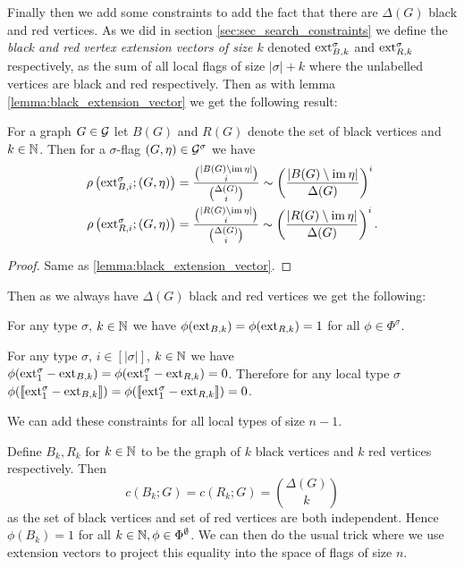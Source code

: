 Finally then we add some constraints to add the fact that there are
$\Delta(G)$ black and red vertices. As we did in section
\ref{sec:sec_search_constraints} we define the
\textit{black and red vertex extension vectors of size $k$} denoted
$\mathrm{ext}_{B,k}^\sigma$ and $\mathrm{ext}_{R,k}^\sigma$ respectively, as the sum of all
local flags of size $|\sigma|+k$ where the unlabelled vertices are black
and red respectively.
Then as with lemma \ref{lemma:black_extension_vector} we get the following result:

\begin{lemma}
    For a graph $G\in\mathcal{G}$ let $B(G)$ and $R(G)$ denote the set of black vertices and
    $k\in \mathbb{N}$. Then for a $\sigma$-flag $(G,\eta) \in \mathcal{G}^\sigma$ we have
    \[
        \begin{split}
            \rho\left(\mathrm{ext}_{B,i}^\sigma; (G,\eta)\right)
            &= \frac{\binom{|B(G) \setminus \operatorname{im}\eta|}{i}}{\binom{\Delta(G)}{i}}
            \sim 
            \left(\frac{|B(G)\setminus\operatorname{im}\eta|}{\Delta(G)}\right)^i\\
            \rho\left(\mathrm{ext}_{R,i}^\sigma; (G,\eta)\right)
            &= \frac{\binom{|R(G) \setminus \operatorname{im}\eta|}{i}}{\binom{\Delta(G)}{i}}
            \sim 
            \left(\frac{|R(G)\setminus\operatorname{im}\eta|}{\Delta(G)}\right)^i.
        \end{split}
    \]
\end{lemma}
\begin{proof}
    Same as \ref{lemma:black_extension_vector}.
\end{proof}
Then as we always have $\Delta(G)$ black and red vertices we get the following:
\begin{corollary}
    For any type $\sigma$, $k\in\mathbb{N}$ we have $\phi(\mathrm{ext}_{B,k})=\phi(\mathrm{ext}_{R,k})=1$
    for all $\phi\in\Phi^\sigma$.
\end{corollary}
\begin{corollary}
    For any type $\sigma$, $i\in[|\sigma|]$, $k\in\mathbb{N}$ we have
    $\phi(\mathrm{ext}_1^\sigma - \mathrm{ext}_{B,k}) = \phi(\mathrm{ext}_1^\sigma - \mathrm{ext}_{R,k}) = 0$.
    Therefore for any local type $\sigma$
    $\phi(\llbracket \mathrm{ext}_1^\sigma - \mathrm{ext}_{B,k}\rrbracket) = \phi(\llbracket \mathrm{ext}_1^\sigma - \mathrm{ext}_{R,k}\rrbracket) = 0$.
\end{corollary}
We can add these constraints for all local types of size $n-1$.

Define $B_k, R_k$ for $k\in\mathbb{N}$ to be the graph of $k$ black vertices and $k$ red vertices
respectively. Then
\[
    c(B_k; G) = c(R_k; G)
    = \binom{\Delta(G)}{k}
\]
as the set of black vertices and set of red vertices are both independent.
Hence $\phi(B_k) = 1$ for all $k\in\mathbb{N}, \phi\in\Phi^\emptyset$. We can then do the
usual trick where we use extension vectors to project this equality
into the space of flags of size $n$.

